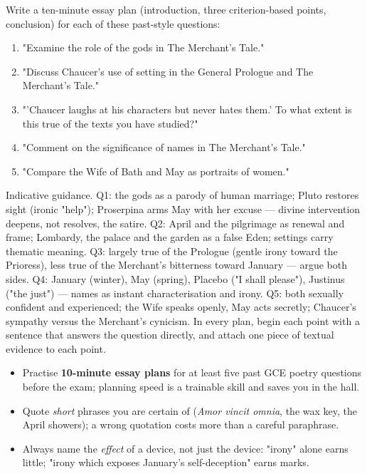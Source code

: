 \documentclass[11pt]{article}
\begin{document}
\begin{exercice}
Write a ten-minute essay plan (introduction, three criterion-based points, conclusion) for each of these past-style questions:
\begin{enumerate}
\item "Examine the role of the gods in The Merchant's Tale."
\item "Discuss Chaucer's use of setting in the General Prologue and The Merchant's Tale."
\item "'Chaucer laughs at his characters but never hates them.' To what extent is this true of the texts you have studied?"
\item "Comment on the significance of names in The Merchant's Tale."
\item "Compare the Wife of Bath and May as portraits of women."
\end{enumerate}
\end{exercice}

\begin{corrige}[Exercise 1]
Indicative guidance. Q1: the gods as a parody of human marriage; Pluto restores sight (ironic "help"); Proserpina arms May with her excuse — divine intervention deepens, not resolves, the satire. Q2: April and the pilgrimage as renewal and frame; Lombardy, the palace and the garden as a false Eden; settings carry thematic meaning. Q3: largely true of the Prologue (gentle irony toward the Prioress), less true of the Merchant's bitterness toward January — argue both sides. Q4: January (winter), May (spring), Placebo ("I shall please"), Justinus ("the just") — names as instant characterisation and irony. Q5: both sexually confident and experienced; the Wife speaks openly, May acts secretly; Chaucer's sympathy versus the Merchant's cynicism. In every plan, begin each point with a sentence that answers the question directly, and attach one piece of textual evidence to each point.
\end{corrige}

\begin{attention}
\begin{itemize}
\item Practise \textbf{10-minute essay plans} for at least five past GCE poetry questions before the exam; planning speed is a trainable skill and saves you in the hall.
\item Quote \emph{short} phrases you are certain of (\emph{Amor vincit omnia}, the wax key, the April showers); a wrong quotation costs more than a careful paraphrase.
\item Always name the \emph{effect} of a device, not just the device: "irony" alone earns little; "irony which exposes January's self-deception" earns marks.
\end{itemize}
\end{attention}
\end{document}
